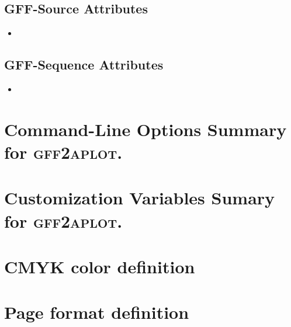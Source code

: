 \documentclass[11pt]{article}
\newcommand{\sctn}[1]{\section{#1}}
\newcommand{\subsctn}[1]{\subsection{#1}}
\def\prog{\textsc{\textbf{gff2aplot}}}
\begin{document}
\subsctn{GFF-Source Attributes}

 \begin{itemize}
  
  \item 
 \end{itemize}

\subsctn{GFF-Sequence Attributes}

 \begin{itemize}
  
  \item 
 \end{itemize}



% 
% 
% 

\appendix

\newpage

\sctn{Command-Line Options Summary for \prog.}


\newpage

\sctn{Customization Variables Sumary for \prog.}


\newpage
\landscape

  
  
  
  
  
  

  

  

  

  

  

\newpage
\endlandscape

\sctn{CMYK color definition}



\newpage

\sctn{Page format definition}


\end{document}
